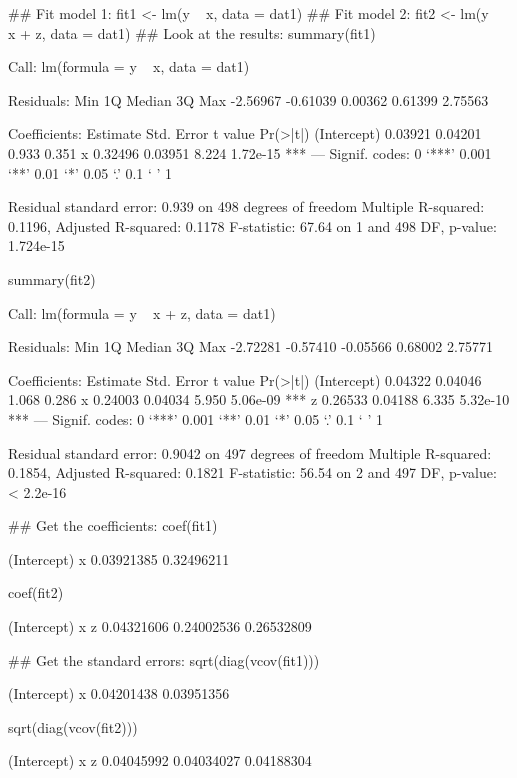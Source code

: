 \begin{Schunk}
\begin{Sinput}
 ## Fit model 1:
 fit1 <- lm(y ~ x, data = dat1)
 ## Fit model 2:
 fit2 <- lm(y ~ x + z, data = dat1)
 ## Look at the results:
 summary(fit1)
\end{Sinput}
\begin{Soutput}
Call:
lm(formula = y ~ x, data = dat1)

Residuals:
     Min       1Q   Median       3Q      Max 
-2.56967 -0.61039  0.00362  0.61399  2.75563 

Coefficients:
            Estimate Std. Error t value Pr(>|t|)    
(Intercept)  0.03921    0.04201   0.933    0.351    
x            0.32496    0.03951   8.224 1.72e-15 ***
---
Signif. codes:  0 ‘***’ 0.001 ‘**’ 0.01 ‘*’ 0.05 ‘.’ 0.1 ‘ ’ 1

Residual standard error: 0.939 on 498 degrees of freedom
Multiple R-squared:  0.1196,	Adjusted R-squared:  0.1178 
F-statistic: 67.64 on 1 and 498 DF,  p-value: 1.724e-15
\end{Soutput}
\begin{Sinput}
 summary(fit2)
\end{Sinput}
\begin{Soutput}
Call:
lm(formula = y ~ x + z, data = dat1)

Residuals:
     Min       1Q   Median       3Q      Max 
-2.72281 -0.57410 -0.05566  0.68002  2.75771 

Coefficients:
            Estimate Std. Error t value Pr(>|t|)    
(Intercept)  0.04322    0.04046   1.068    0.286    
x            0.24003    0.04034   5.950 5.06e-09 ***
z            0.26533    0.04188   6.335 5.32e-10 ***
---
Signif. codes:  0 ‘***’ 0.001 ‘**’ 0.01 ‘*’ 0.05 ‘.’ 0.1 ‘ ’ 1

Residual standard error: 0.9042 on 497 degrees of freedom
Multiple R-squared:  0.1854,	Adjusted R-squared:  0.1821 
F-statistic: 56.54 on 2 and 497 DF,  p-value: < 2.2e-16
\end{Soutput}
\begin{Sinput}
 ## Get the coefficients:
 coef(fit1)
\end{Sinput}
\begin{Soutput}
(Intercept)           x 
 0.03921385  0.32496211 
\end{Soutput}
\begin{Sinput}
 coef(fit2)
\end{Sinput}
\begin{Soutput}
(Intercept)           x           z 
 0.04321606  0.24002536  0.26532809 
\end{Soutput}
\begin{Sinput}
 ## Get the standard errors:
 sqrt(diag(vcov(fit1)))
\end{Sinput}
\begin{Soutput}
(Intercept)           x 
 0.04201438  0.03951356 
\end{Soutput}
\begin{Sinput}
 sqrt(diag(vcov(fit2)))
\end{Sinput}
\begin{Soutput}
(Intercept)           x           z 
 0.04045992  0.04034027  0.04188304 
\end{Soutput}
\end{Schunk}
